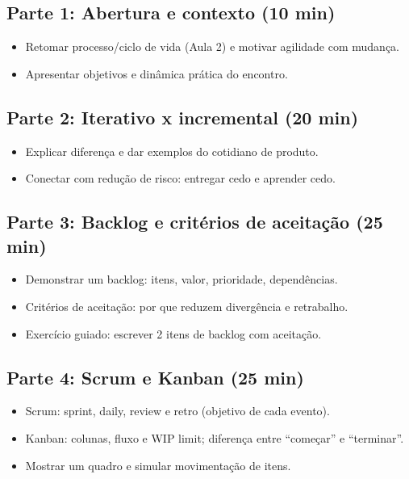 \documentclass[12pt,a4paper]{article}
\begin{document}
\subsection*{Parte 1: Abertura e contexto (10 min)}
\begin{itemize}[leftmargin=*,itemsep=0.35em]
  \item Retomar processo/ciclo de vida (Aula 2) e motivar agilidade com mudança.
  \item Apresentar objetivos e dinâmica prática do encontro.
\end{itemize}

\subsection*{Parte 2: Iterativo x incremental (20 min)}
\begin{itemize}[leftmargin=*,itemsep=0.35em]
  \item Explicar diferença e dar exemplos do cotidiano de produto.
  \item Conectar com redução de risco: entregar cedo e aprender cedo.
\end{itemize}

\subsection*{Parte 3: Backlog e critérios de aceitação (25 min)}
\begin{itemize}[leftmargin=*,itemsep=0.35em]
  \item Demonstrar um backlog: itens, valor, prioridade, dependências.
  \item Critérios de aceitação: por que reduzem divergência e retrabalho.
  \item Exercício guiado: escrever 2 itens de backlog com aceitação.
\end{itemize}

\subsection*{Parte 4: Scrum e Kanban (25 min)}
\begin{itemize}[leftmargin=*,itemsep=0.35em]
  \item Scrum: sprint, daily, review e retro (objetivo de cada evento).
  \item Kanban: colunas, fluxo e WIP limit; diferença entre ``começar'' e ``terminar''.
  \item Mostrar um quadro e simular movimentação de itens.
\end{itemize}
\end{document}
